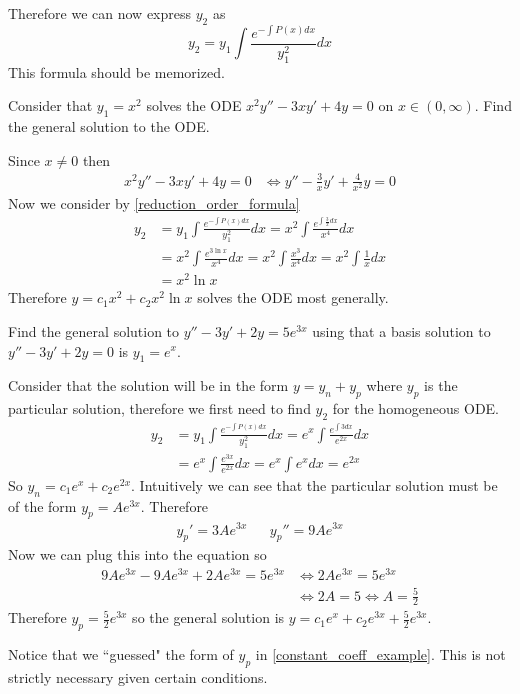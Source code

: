 \documentclass[notes]{subfiles}
\begin{document}
Therefore we can now express $y_2$ as
\begin{equation} \label{reduction_order_formula}
    y_2 = y_1\int \frac{e^{-\int P(x)dx}}{y_1^2} dx
\end{equation}
This formula should be memorized.

\begin{exercise}
    Consider that $y_1 = x^2$ solves the ODE $x^2y'' - 3xy' + 4y = 0$ on $x \in (0, \infty)$. Find the general solution to the ODE.
\end{exercise}
\begin{solution}
    Since $x \neq 0$ then
    \begin{align*}
        x^2y'' - 3xy' + 4y = 0
        &\iff y'' - \frac{3}{x}y' + \frac{4}{x^2}y = 0
    \end{align*}
    Now we consider by \cref{reduction_order_formula}
    \begin{align*}
        y_2
        &= y_1\int \frac{e^{-\int P(x)dx}}{y_1^2} dx
        = x^2\int \frac{e^{\int \frac{3}{x}dx}}{x^4} dx \\
        &= x^2\int \frac{e^{3\ln x}}{x^4} dx
        = x^2\int \frac{x^3}{x^4} dx
        = x^2\int \frac{1}{x} dx \\
        &= x^2\ln x
    \end{align*}
    Therefore $y = c_1x^2 + c_2x^2\ln x$ solves the ODE most generally.
\end{solution}

\begin{exercise} \label{constant_coeff_example}
    Find the general solution to $y'' - 3y' + 2y = 5e^{3x}$ using that a basis solution to $y'' - 3y' + 2y = 0$ is $y_1 = e^x$.
\end{exercise}
\begin{solution}
    Consider that the solution will be in the form $y = y_n + y_p$ where $y_p$ is the particular solution, therefore we first need to find $y_2$ for the homogeneous ODE.
    \begin{align*}
        y_2
        &= y_1\int \frac{e^{-\int P(x)dx}}{y_1^2} dx
        = e^x\int \frac{e^{\int 3dx}}{e^{2x}} dx \\
        &= e^x\int \frac{e^{3x}}{e^{2x}} dx
        = e^x\int e^x dx
        = e^{2x}
    \end{align*}
    So $y_n = c_1e^x + c_2e^{2x}$. Intuitively we can see that the particular solution must be of the form $y_p = Ae^{3x}$. Therefore
    \begin{align*}
        y_p' = 3Ae^{3x} && y_p'' = 9Ae^{3x}
    \end{align*}
    Now we can plug this into the equation so
    \begin{align*}
        9Ae^{3x} - 9Ae^{3x} + 2Ae^{3x} = 5e^{3x}
        &\iff 2Ae^{3x} = 5e^{3x} \\
        &\iff 2A = 5
        \iff A = \frac{5}{2}
    \end{align*}
    Therefore $y_p = \frac{5}{2}e^{3x}$ so the general solution is $y = c_1e^x + c_2e^{3x} + \frac{5}{2}e^{3x}$.
\end{solution}

Notice that we ``guessed" the form of $y_p$ in \cref{constant_coeff_example}. This is not strictly necessary given certain conditions.
\end{document}
